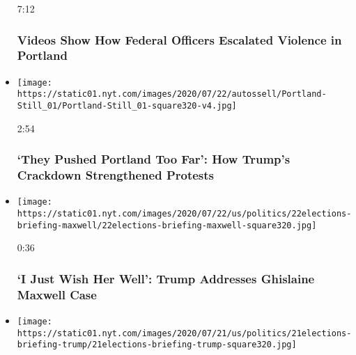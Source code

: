 \begin{itemize}
  7:12

  \hypertarget{videos-show-how-federal-officers-escalated-violence-in-portland}{%
  \subsubsection{Videos Show How Federal Officers Escalated Violence in
  Portland}\label{videos-show-how-federal-officers-escalated-violence-in-portland}}
\item
  \href{https://www.nytimes.com/video/us/100000007250985/they-pushed-portland-too-far-trump-crackdown-strengthens-protests.html?action=click\&module=video-series-bar\&region=header\&pgtype=Article\&playlistId=video/u-s}{}

  \texttt{[image: https://static01.nyt.com/images/2020/07/22/autossell/Portland-Still\_01/Portland-Still\_01-square320-v4.jpg]}

  2:54

  \hypertarget{they-pushed-portland-too-far-how-trumps-crackdown-strengthened-protests}{%
  \subsubsection{`They Pushed Portland Too Far': How Trump's Crackdown
  Strengthened
  Protests}\label{they-pushed-portland-too-far-how-trumps-crackdown-strengthened-protests}}
\item
  \href{https://www.nytimes.com/video/us/politics/100000007251195/trump-ghislaine-maxwell.html?action=click\&module=video-series-bar\&region=header\&pgtype=Article\&playlistId=video/u-s}{}

  \texttt{[image: https://static01.nyt.com/images/2020/07/22/us/politics/22elections-briefing-maxwell/22elections-briefing-maxwell-square320.jpg]}

  0:36

  \hypertarget{i-just-wish-her-well-trump-addresses-ghislaine-maxwell-case}{%
  \subsubsection{`I Just Wish Her Well': Trump Addresses Ghislaine
  Maxwell
  Case}\label{i-just-wish-her-well-trump-addresses-ghislaine-maxwell-case}}
\item
  \href{https://www.nytimes.com/video/us/100000007250068/trump-says-virus-worse-before-better.html?action=click\&module=video-series-bar\&region=header\&pgtype=Article\&playlistId=video/u-s}{}

  \texttt{[image: https://static01.nyt.com/images/2020/07/21/us/politics/21elections-briefing-trump/21elections-briefing-trump-square320.jpg]}


\end{itemize}
